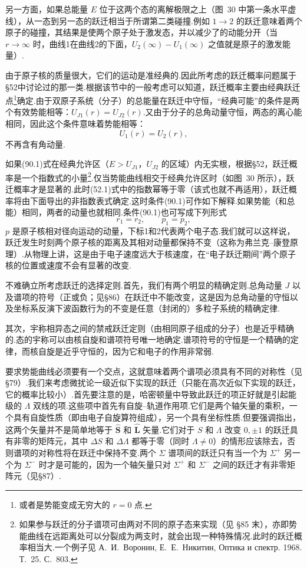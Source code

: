 另一方面，如果总能量 $E$ 位于这两个态的离解极限之上（图~30 中第一条水平虚线），从一态到另一态的跃迁相当于所谓第二类碰撞.例如 $1\to2$ 的跃迁意味着两个原子的碰撞，其结果是使两个原子处于激发态，并以减少了的动能分开（当 $r\to\infty$ 时，曲线1在曲线2的下面，$U_2(\infty)-U_1(\infty)$ 之值就是原子的激发能量）.

由于原子核的质量很大，它们的运动是准经典的.因此所考虑的跃迁概率问题属于§52中讨论过的那一类.根据该节中的一般考虑可以知道，跃迁概率主要由经典跃迁点\footnote{或者是势能变成无穷大的 $r=0$ 点.}确定.由于双原子系统（分子）的总能量在跃迁中守恒，“经典可能”的条件是两个有效势能相等：$U_{J1}(r)=U_{J2}(r)$.又由于分子的总角动量守恒，两态的离心能相同，因此这个条件意味着势能相等：
\begin{equation}
  U_1(r)=U_2(r),
\end{equation}
不再含有角动量.

如果(90.1)式在经典允许区（$E>U_{J1}$，$U_{J2}$ 的区域）内无实根，根据§52，跃迁概率是一个指数式的小量\footnote{如果参与跃迁的分子谱项可由两对不同的原子态来实现（见 §85 末），亦即势能曲线在远距离处可以分裂成为两支时，就会出现一种特殊情况.此时的跃迁概率相当大.一个例子见 А.~И.~Воронин, Е.~Е.~Никитин, Оптика и спектр. 1968. Т.~25. С.~803.}.仅当势能曲线相交于经典允许区时（如图~30 所示），跃迁概率才是显著的.此时(52.1)式中的指数幂等于零（该式也就不再适用），跃迁概率将由下面导出的非指数表式确定.这时条件(90.1)可作如下解释.如果势能（和总能）相同，两者的动量也就相同.条件(90.1)也可写成下列形式
\begin{equation}
  r_1=r_2,\qquad p_1=p_2,
\end{equation}
$p$ 是原子核相对径向运动的动量，下标1和2代表两个电子态.我们就可以这样说，跃迁发生时刻两个原子核的距离及其相对动量都保持不变（这称为弗兰克–康登原理）.从物理上讲，这是由于电子速度远大于核速度，在“电子跃迁期间”两个原子核的位置或速度不会有显著的改变.

不难确立所考虑跃迁的选择定则.首先，我们有两个明显的精确定则.总角动量 $J$ 以及谱项的符号（正或负；见§86）在跃迁中不能改变，这是因为总角动量的守恒以及坐标系反演下波函数行为的不变是任意（封闭的）多粒子系统的精确定律.

其次，宇称相异态之间的禁戒跃迁定则（由相同原子组成的分子）也是近乎精确的.态的宇称可以由核自旋和谱项符号唯一地确定.谱项符号的守恒是一个精确的定律，而核自旋是近乎守恒的，因为它和电子的作用非常弱.

要求势能曲线必须要有一个交点，这就意味着两个谱项必须具有不同的对称性（见§79）.我们来考虑微扰论一级近似下实现的跃迁（只能在高次近似下实现的跃迁，它的概率比较小）.首先要注意的是，哈密顿量中导致此跃迁的项正好就是引起能级的 $\Lambda$ 双线的项.这些项中首先有自旋–轨道作用项.它们是两个轴矢量的乘积，一个具有自旋性质（即由电子自旋算符组成），另一个具有坐标性质.但要强调指出，这两个矢量并不是简单地等于 $\hat{\boldsymbol{S}}$ 和 $\hat{\boldsymbol{L}}$ 矢量.它们对于 $S$ 和 $\Lambda$ 改变 $0,\pm1$ 的跃迁具有非零的矩阵元，其中 $\Delta S$ 和 $\Delta\Lambda$ 都等于零（同时 $\Lambda\neq0$）的情形应该除去，否则谱项的对称性将在跃迁中保持不变.两个 $\Sigma$ 谱项间的跃迁只有当一个为 $\Sigma^+$ 另一个为 $\Sigma^-$ 时才是可能的，因为一个轴矢量只对 $\Sigma^+$ 和 $\Sigma^-$ 之间的跃迁才有非零矩阵元（见§87）.

